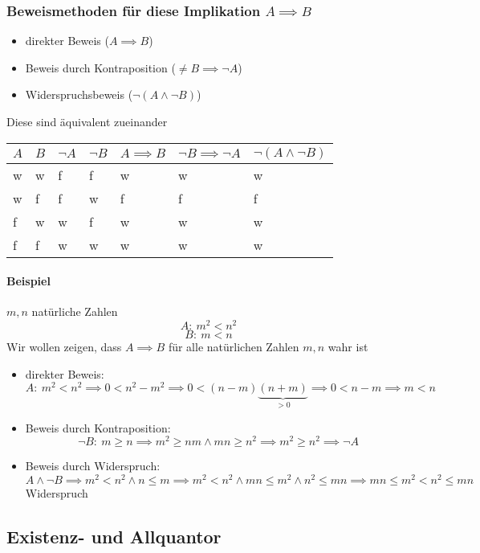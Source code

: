 \documentclass[a4paper]{scrartcl}
\theoremstyle{definition}
\theoremstyle{plain}
\theoremstyle{plain}
\theoremstyle{remark}
\theoremstyle{remark}
\theoremstyle{remark}
\theoremstyle{remark}
\theoremstyle{remark}
\begin{document}
\subsubsection{Beweismethoden für diese Implikation $A\implies B$}
\label{sec-2-2-2}
\begin{itemize}
\item direkter Beweis ($A\implies B$)
\item Beweis durch Kontraposition ($\neq B \implies \neg A$)
\item Widerspruchsbeweis ($\neg (A\wedge \neg B)$)
\end{itemize}
Diese sind äquivalent zueinander
\begin{center}
\begin{tabular}{lllllll}
$A$ & $B$ & $\neg A$ & $\neg B$ & $A\implies B$ & $\neg B \implies \neg A$ & $\neg (A \wedge \neg B)$\\
\hline
w & w & f & f & w & w & w\\
w & f & f & w & f & f & f\\
f & w & w & f & w & w & w\\
f & f & w & w & w & w & w\\
\end{tabular}
\end{center}
\paragraph{Beispiel}
\label{sec-2-2-2-1}
$m,n$ natürliche Zahlen \\
         \[A:~m^2 < n^2\]
\[B:~m < n\]
Wir wollen zeigen, dass $A\implies B$ für alle natürlichen Zahlen $m,n$ wahr ist
\begin{itemize}
\item direkter Beweis: \\
           \[A:~m^2 < n^2 \implies 0 < n^2 - m^2 \implies 0 < (n-m)\underbrace{(n+m)}_{>0} \implies 0 < n-m \implies m<n\]
\item Beweis durch Kontraposition: \\
           \[\neg B:~m \geq n \implies m^2\geq n m \wedge m n \geq n^2 \implies m^2 \geq n^2 \implies \neg A\]
\item Beweis durch Widerspruch: \\
           \[A\wedge \neg B \implies m^2 < n^2 \wedge n\leq m \implies m^2 < n^2 \wedge m n \leq m^2 \wedge n^2 \leq m n \implies m n \leq m^2 < n^2 \leq m n\]
           Widerspruch
\end{itemize}
\subsection{Existenz- und Allquantor}
\label{sec-2-3}
\end{document}
